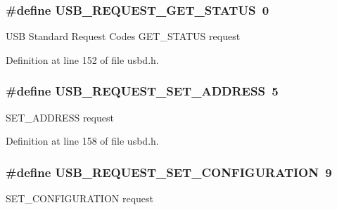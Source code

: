 \subsubsection[{\texorpdfstring{U\+S\+B\+\_\+\+R\+E\+Q\+U\+E\+S\+T\+\_\+\+G\+E\+T\+\_\+\+S\+T\+A\+T\+US}{USB_REQUEST_GET_STATUS}}]{\setlength{\rightskip}{0pt plus 5cm}\#define U\+S\+B\+\_\+\+R\+E\+Q\+U\+E\+S\+T\+\_\+\+G\+E\+T\+\_\+\+S\+T\+A\+T\+US~0}\hypertarget{group__USBD__Core_ga062f3147a1bae954b642b915827b3f3f}{}\label{group__USBD__Core_ga062f3147a1bae954b642b915827b3f3f}
U\+SB Standard Request Codes G\+E\+T\+\_\+\+S\+T\+A\+T\+US request 

Definition at line 152 of file usbd.\+h.

\subsubsection[{\texorpdfstring{U\+S\+B\+\_\+\+R\+E\+Q\+U\+E\+S\+T\+\_\+\+S\+E\+T\+\_\+\+A\+D\+D\+R\+E\+SS}{USB_REQUEST_SET_ADDRESS}}]{\setlength{\rightskip}{0pt plus 5cm}\#define U\+S\+B\+\_\+\+R\+E\+Q\+U\+E\+S\+T\+\_\+\+S\+E\+T\+\_\+\+A\+D\+D\+R\+E\+SS~5}\hypertarget{group__USBD__Core_gac87659819bfd6491120c819fae2d46bc}{}\label{group__USBD__Core_gac87659819bfd6491120c819fae2d46bc}
S\+E\+T\+\_\+\+A\+D\+D\+R\+E\+SS request 

Definition at line 158 of file usbd.\+h.

\subsubsection[{\texorpdfstring{U\+S\+B\+\_\+\+R\+E\+Q\+U\+E\+S\+T\+\_\+\+S\+E\+T\+\_\+\+C\+O\+N\+F\+I\+G\+U\+R\+A\+T\+I\+ON}{USB_REQUEST_SET_CONFIGURATION}}]{\setlength{\rightskip}{0pt plus 5cm}\#define U\+S\+B\+\_\+\+R\+E\+Q\+U\+E\+S\+T\+\_\+\+S\+E\+T\+\_\+\+C\+O\+N\+F\+I\+G\+U\+R\+A\+T\+I\+ON~9}\hypertarget{group__USBD__Core_gaadef005acc40340955d34d9767ef297c}{}\label{group__USBD__Core_gaadef005acc40340955d34d9767ef297c}
S\+E\+T\+\_\+\+C\+O\+N\+F\+I\+G\+U\+R\+A\+T\+I\+ON request 

